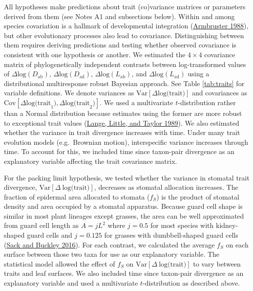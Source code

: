 \documentclass[
  12pt,
]{article}
\begin{document}
All hypotheses make predictions about trait (co)variance matrices or parameters derived from them (see Notes A1 and subsections below). Within and among species covariation is a hallmark of developmental integration (\protect\hyperlink{ref-armbruster_multilevel_1988}{Armbruster 1988}), but other evolutionary processes also lead to covariance. Distinguishing between them requires deriving predictions and testing whether observed covariance is consistent with one hypothesis or another. We estimated the \(4 \times 4\) covariance matrix of phylogenetically independent contrasts between log-transformed values of \(\Delta \text{log}(D_\mathrm{ab})\), \(\Delta \text{log}(D_\mathrm{ad})\), \(\Delta \text{log}(L_\mathrm{ab})\), and \(\Delta \text{log}(L_\mathrm{ad})\) using a distributional multiresponse robust Bayesian approach. See Table \ref{tab:traits} for variable definitions. We denote variances as \(\text{Var}[\Delta \text{log(trait)}]\) and covariances as \(\text{Cov}[\Delta \text{log(trait}_1),\Delta \text{log(trait}_2)]\). We used a multivariate \(t\)-distribution rather than a Normal distribution because estimates using the former are more robust to exceptional trait values (\protect\hyperlink{ref-lange_robust_1989}{Lange, Little, and Taylor 1989}). We also estimated whether the variance in trait divergence increases with time. Under many trait evolution models (e.g.~Brownian motion), interspecific variance increases through time. To account for this, we included time since taxon-pair divergence as an explanatory variable affecting the trait covariance matrix.

For the packing limit hypothesis, we tested whether the variance in stomatal trait divergence, \(\textrm{Var}[\Delta~\textrm{log(trait)}]\), decreases as stomatal allocation increases. The fraction of epidermal area allocated to stomata (\(f_S\)) is the product of stomatal density and area occupied by a stomatal apparatus. Because guard cell shape is similar in most plant lineages except grasses, the area can be well approximated from guard cell length as \(A = j L ^ 2\) where \(j = 0.5\) for most species with kidney-shaped guard cells and \(j = 0.125\) for grasses with dumbbell-shaped guard cells (\protect\hyperlink{ref-sack_developmental_2016}{Sack and Buckley 2016}). For each contrast, we calculated the average \(f_S\) on each surface between those two taxa for use as our explanatory variable. The statistical model allowed the effect of \(f_S\) on \(\textrm{Var}[\Delta~\textrm{log(trait)}]\) to vary between traits and leaf surfaces. We also included time since taxon-pair divergence as an explanatory variable and used a multivariate \(t\)-distribution as described above.
\end{document}
